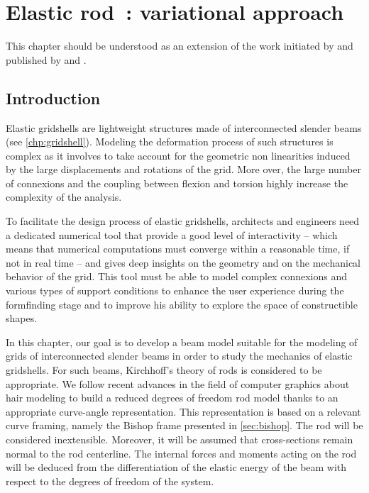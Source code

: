 
\chapter{Elastic rod~: variational approach}
\label{sec:ch_energy}

This chapter should be understood as an extension of the work initiated by  and published by  and .

\section{Introduction}

Elastic gridshells are lightweight structures made of interconnected slender beams (see \cref{chp:gridshell}). Modeling the deformation process of such structures is complex as it involves to take account for the geometric non linearities induced by the large displacements and rotations of the grid. More over, the large number of connexions and the coupling between flexion and torsion highly increase the complexity of the analysis.

To facilitate the design process of elastic gridshells, architects and engineers need a dedicated numerical tool that provide a good level of interactivity -- which means that numerical computations must converge within a reasonable time, if not in real time -- and gives deep insights on the geometry and on the mechanical behavior of the grid. This tool must be able to model complex connexions and various types of support conditions to enhance the user experience during the formfinding stage and to improve his ability to explore the space of constructible shapes.

In this chapter, our goal is to develop a beam model suitable for the modeling of grids of interconnected slender beams in order to study the mechanics of elastic gridshells. For such beams, Kirchhoff's theory of rods is considered to be appropriate. We follow recent advances in the field of computer graphics about hair modeling \cite{Bergou2008} to build a reduced degrees of freedom rod model thanks to an appropriate curve-angle representation. This representation is based on a relevant curve framing, namely the Bishop frame presented in \cref{sec:bishop}. The rod will be considered inextensible. Moreover, it will be assumed that cross-sections remain normal to the rod centerline. The internal forces and moments acting on the rod will be deduced from the differentiation of the elastic energy of the beam with respect to the degrees of freedom of the system.

